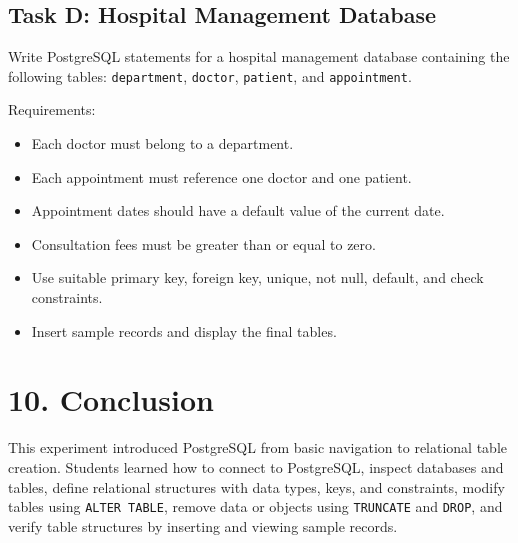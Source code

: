 \documentclass[12pt,a4paper]{article}
\newcommand{\screenshotplaceholder}[2]{%
  \begin{figure}[H]
      \centering
      \fbox{\parbox[c][#1][c]{0.9\linewidth}{\centering #2}}
  \end{figure}
}
\begin{document}

\subsection*{Task D: Hospital Management Database}
Write PostgreSQL statements for a hospital management database containing the following tables:
\texttt{department}, \texttt{doctor}, \texttt{patient}, and \texttt{appointment}.

\noindent Requirements:
\begin{itemize}
    \item Each doctor must belong to a department.
    \item Each appointment must reference one doctor and one patient.
    \item Appointment dates should have a default value of the current date.
    \item Consultation fees must be greater than or equal to zero.
    \item Use suitable primary key, foreign key, unique, not null, default, and check constraints.
    \item Insert sample records and display the final tables.
\end{itemize}


\section*{10. Conclusion}
This experiment introduced PostgreSQL from basic navigation to relational table creation. Students
learned how to connect to PostgreSQL, inspect databases and tables, define relational structures with
data types, keys, and constraints, modify tables using \texttt{ALTER TABLE}, remove data or objects
using \texttt{TRUNCATE} and \texttt{DROP}, and verify table structures by inserting and viewing sample
records.
\end{document}
